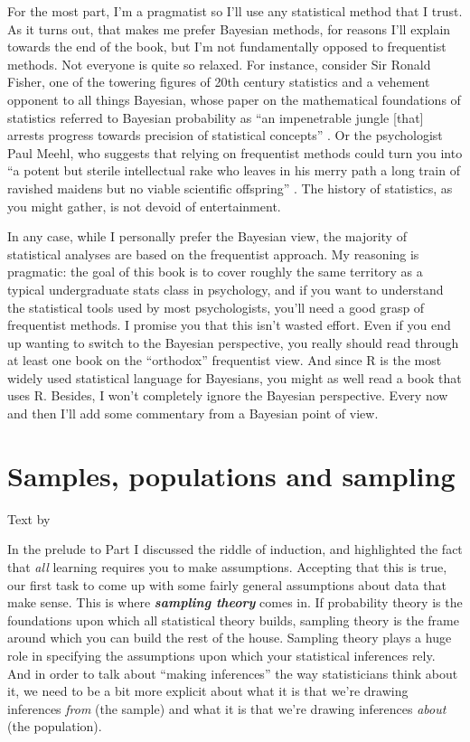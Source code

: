 \documentclass[
]{book}
\begin{document}
For the most part, I'm a pragmatist so I'll use any statistical method that I trust. As it turns out, that makes me prefer Bayesian methods, for reasons I'll explain towards the end of the book, but I'm not fundamentally opposed to frequentist methods. Not everyone is quite so relaxed. For instance, consider Sir Ronald Fisher, one of the towering figures of 20th century statistics and a vehement opponent to all things Bayesian, whose paper on the mathematical foundations of statistics referred to Bayesian probability as ``an impenetrable jungle {[}that{]} arrests progress towards precision of statistical concepts'' \citet{Fisher1922b}. Or the psychologist Paul Meehl, who suggests that relying on frequentist methods could turn you into ``a potent but sterile intellectual rake who leaves in his merry path a long train of ravished maidens but no viable scientific offspring'' \citet{Meehl1967}. The history of statistics, as you might gather, is not devoid of entertainment.

In any case, while I personally prefer the Bayesian view, the majority of statistical analyses are based on the frequentist approach. My reasoning is pragmatic: the goal of this book is to cover roughly the same territory as a typical undergraduate stats class in psychology, and if you want to understand the statistical tools used by most psychologists, you'll need a good grasp of frequentist methods. I promise you that this isn't wasted effort. Even if you end up wanting to switch to the Bayesian perspective, you really should read through at least one book on the ``orthodox'' frequentist view. And since R is the most widely used statistical language for Bayesians, you might as well read a book that uses R. Besides, I won't completely ignore the Bayesian perspective. Every now and then I'll add some commentary from a Bayesian point of view.

\hypertarget{srs}{%
\section{Samples, populations and sampling}\label{srs}}

Text by \citet{Navarro2018}

In the prelude to Part I discussed the riddle of induction, and highlighted the fact that \emph{all} learning requires you to make assumptions. Accepting that this is true, our first task to come up with some fairly general assumptions about data that make sense. This is where \textbf{\emph{sampling theory}} comes in. If probability theory is the foundations upon which all statistical theory builds, sampling theory is the frame around which you can build the rest of the house. Sampling theory plays a huge role in specifying the assumptions upon which your statistical inferences rely. And in order to talk about ``making inferences'' the way statisticians think about it, we need to be a bit more explicit about what it is that we're drawing inferences \emph{from} (the sample) and what it is that we're drawing inferences \emph{about} (the population).
\end{document}
